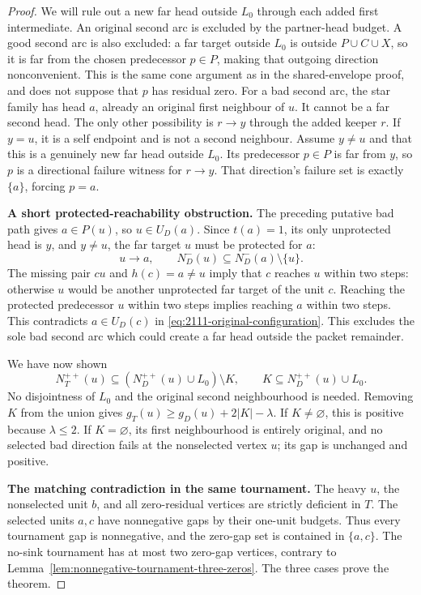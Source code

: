 \begin{proof}
We will rule out a new far head outside $L_0$ through each added
first intermediate. An original second arc is excluded by the
partner-head budget. A good second arc is also excluded: a far target
outside $L_0$ is outside $P\cup C\cup X$, so it is far from the
chosen predecessor $p\in P$, making that outgoing direction
nonconvenient. This is the same cone argument as in the shared-envelope
proof, and does not suppose that $p$ has residual zero.
For a bad second arc, the star family has head $a$, already an
original first neighbour of $u$. It cannot be a far second head.
The only other possibility is $r\to y$ through the added keeper $r$.
If $y=u$, it is a self endpoint and is not a second neighbour.
Assume $y\ne u$ and that this is a genuinely new far head outside
$L_0$. Its predecessor $p\in P$ is far from $y$, so $p$ is a
directional failure witness for $r\to y$. That direction's failure
set is exactly $\{a\}$, forcing $p=a$.

\par\medskip\noindent\textbf{A short protected-reachability obstruction.}\quad 
The preceding putative bad path gives $a\in P(u)$, so $u\in U_D(a)$.
Since $t(a)=1$, its only unprotected head is $y$, and $y\ne u$,
the far target $u$ must be protected for $a$:
\[
 u\to a,\qquad N_D^-(u)\subseteq N_D^-(a)\setminus\{u\}.
\]
The missing pair $cu$ and $h(c)=a\ne u$ imply that $c$ reaches $u$
within two steps: otherwise $u$ would be another unprotected far
target of the unit $c$. Reaching the protected predecessor $u$
within two steps implies reaching $a$ within two steps. This
contradicts $a\in U_D(c)$ in
\eqref{eq:2111-original-configuration}.
This excludes the sole bad second arc which could create a far head
outside the packet remainder.

We have now shown
\[
 N_T^{++}(u)\subseteq
 (N_D^{++}(u)\cup L_0)\setminus K,
 \qquad K\subseteq N_D^{++}(u)\cup L_0.
\]
No disjointness of $L_0$ and the original second neighbourhood is
needed. Removing $K$ from the union gives
$g_T(u)\ge g_D(u)+2|K|-\lambda$.
If $K\ne\varnothing$, this is positive because $\lambda\le2$.
If $K=\varnothing$, its first neighbourhood is entirely original,
and no selected bad direction fails at the nonselected vertex $u$;
its gap is unchanged and positive.

\par\medskip\noindent\textbf{The matching contradiction in the same tournament.}\quad 
The heavy $u$, the nonselected unit $b$, and all zero-residual
vertices are strictly deficient in $T$.
The selected units $a,c$ have nonnegative gaps by their one-unit
budgets. Thus every tournament gap is nonnegative, and the zero-gap
set is contained in $\{a,c\}$.
The no-sink tournament has at most two zero-gap vertices, contrary
to Lemma~\ref{lem:nonnegative-tournament-three-zeros}.
The three cases prove the theorem.
\end{proof}
